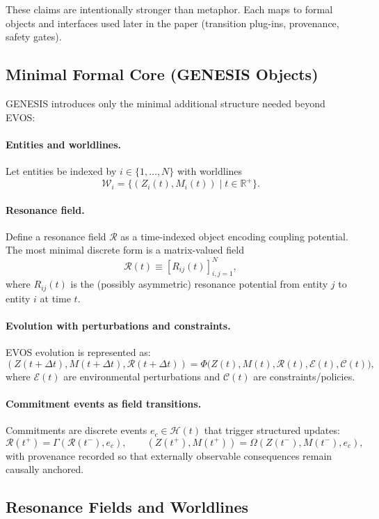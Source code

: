 \documentclass[11pt]{article}
\begin{document}
These claims are intentionally stronger than metaphor. Each maps to formal objects and
interfaces used later in the paper (transition plug-ins, provenance, safety gates).

\subsection{Minimal Formal Core (GENESIS Objects)}

GENESIS introduces only the minimal additional structure needed beyond EVOS:

\paragraph{Entities and worldlines.}
Let entities be indexed by $i \in \{1,\dots,N\}$ with worldlines
\[
\mathcal{W}_i = \{(Z_i(t), M_i(t)) \mid t \in \mathbb{R}^+\}.
\]

\paragraph{Resonance field.}
Define a resonance field $\mathcal{R}$ as a time-indexed object encoding coupling
potential. The most minimal discrete form is a matrix-valued field
\[
\mathcal{R}(t) \equiv [R_{ij}(t)]_{i,j=1}^N,
\]
where $R_{ij}(t)$ is the (possibly asymmetric) resonance potential from entity $j$ to
entity $i$ at time $t$.

\paragraph{Evolution with perturbations and constraints.}
EVOS evolution is represented as:
\[
(Z(t+\Delta t), M(t+\Delta t), \mathcal{R}(t+\Delta t)) =
\Phi\big(Z(t), M(t), \mathcal{R}(t), \mathcal{E}(t), \mathcal{C}(t)\big),
\]
where $\mathcal{E}(t)$ are environmental perturbations and $\mathcal{C}(t)$ are
constraints/policies.

\paragraph{Commitment events as field transitions.}
Commitments are discrete events $e_c \in \mathcal{H}(t)$ that trigger structured updates:
\[
\mathcal{R}(t^+) = \Gamma(\mathcal{R}(t^-), e_c), \qquad
(Z(t^+), M(t^+)) = \Omega(Z(t^-), M(t^-), e_c),
\]
with provenance recorded so that externally observable consequences remain causally anchored.

\subsection{Resonance Fields and Worldlines}
\end{document}
